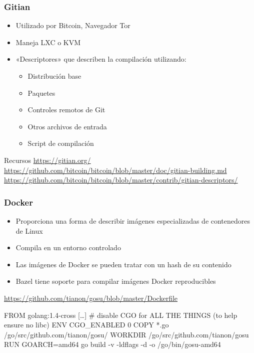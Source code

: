 \documentclass[14pt,aspectratio=169]{beamer}
\begin{document}
\begin{frame}
 \frametitle{Gitian}

 \begin{itemize}
  \item Utilizado por Bitcoin, Navegador Tor
  \item Maneja LXC o KVM
  \item «Descriptores» que describen la compilación utilizando:
   \begin{itemize}
    \item Distribución base
    \item Paquetes
    \item Controles remotos de Git
    \item Otros archivos de entrada
    \item Script de compilación
   \end{itemize}
 \end{itemize}

 \vfill
 \begin{block}{\footnotesize Recursos}\footnotesize
 \url{https://gitian.org/}\\
 \url{https://github.com/bitcoin/bitcoin/blob/master/doc/gitian-building.md}\\
 \url{https://github.com/bitcoin/bitcoin/blob/master/contrib/gitian-descriptors/}
 \end{block}
\end{frame}

\begin{frame}[fragile]
 \frametitle{Docker}

 \begin{itemize}
  \item Proporciona una forma de describir imágenes especializadas de contenedores de Linux
  \item Compila en un entorno controlado
  \item Las imágenes de Docker se pueden tratar con un hash de su contenido
  \item Bazel tiene soporte para compilar imágenes Docker reproducibles
 \end{itemize}

 \begin{block}{\footnotesize \url{https://github.com/tianon/gosu/blob/master/Dockerfile}}\footnotesize
\begin{semiverbatim}
FROM golang:1.4-cross
[…]
# disable CGO for ALL THE THINGS (to help ensure no libc)
ENV CGO\_ENABLED 0
COPY *.go /go/src/github.com/tianon/gosu/
WORKDIR /go/src/github.com/tianon/gosu
RUN GOARCH=amd64 go build -v -ldflags -d -o /go/bin/gosu-amd64
\end{semiverbatim}
 \end{block}
\end{frame}
\end{document}
